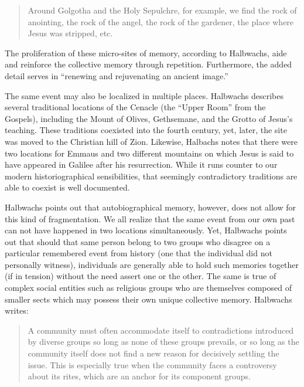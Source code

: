 \begin{quote}
Around Golgotha and the Holy Sepulchre, for example, we find the rock of
anointing, the rock of the angel, the rock of the gardener, the place
where Jesus was stripped, etc.\autocite[220]{halbwachs1992}
\end{quote}

The proliferation of these micro-sites of memory, according to
Halbwachs, aide and reinforce the collective memory through repetition.
Furthermore, the added detail serves in ``renewing and rejuvenating an
ancient image.''\autocite[220]{halbwachs1992}

The same event may also be localized in multiple places. Halbwachs
describes several traditional locations of the Cenacle (the ``Upper
Room'' from the Gospels), including the Mount of Olives, Gethsemane, and
the Grotto of Jesus's teaching. These traditions coexisted into the
fourth century, yet, later, the site was moved to the Christian hill of
Zion. Likewise, Halbachs notes that there were two locations for Emmaus
and two different mountains on which Jesus is said to have appeared in
Galilee after his resurrection. While it runs counter to our modern
historiographical sensibilities, that seemingly contradictory traditions
are able to coexist is well documented.

Halbwachs points out that autobiographical memory, however, does not
allow for this kind of fragmentation. We all realize that the same event
from our own past can not have happened in two locations simultaneously.
Yet, Halbwachs points out that should that same person belong to two
groups who disagree on a particular remembered event from history (one
that the individual did not personally witness), individuals are
generally able to hold such memories together (if in tension) without
the need assert one or the other. The same is true of complex social
entities such as religious groups who are themselves composed of smaller
sects which may possess their own unique collective memory. Halbwachs
writes:

\begin{quote}
A community must often accommodate itself to contradictions introduced
by diverse groups so long as none of these groups prevails, or so long
as the community itself does not find a new reason for decisively
settling the issue. This is especially true when the community faces a
controversy about its rites, which are an anchor for its component
groups.\autocite[224]{halbwachs1992}
\end{quote}

